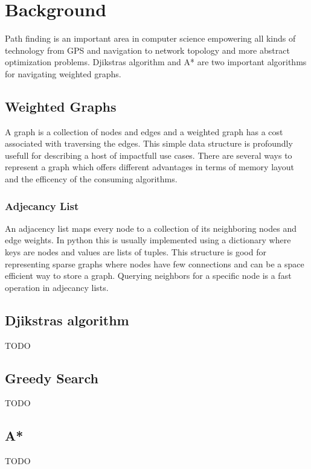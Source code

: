 \section{Background}
\label{sec:background}

Path finding is an important area in computer science empowering all kinds of technology from GPS and navigation to network topology and more abstract optimization problems.
Djikstras algorithm and A* are two important algorithms for navigating weighted graphs.

\subsection{Weighted Graphs}

A graph is a collection of nodes and edges and a weighted graph has a cost associated with traversing the edges. This simple data structure is profoundly usefull for describing a host of impactfull use cases. There are several ways to represent a graph which offers different advantages in terms of memory layout and the efficency of the consuming algorithms.

\subsubsection{Adjecancy List}
An adjacency list maps every node to a collection of its neighboring nodes and edge weights. In python this is usually implemented using a dictionary where keys are nodes and values are lists of tuples.
This structure is good for representing sparse graphs where nodes have few connections and can be a space efficient way to store a graph. Querying neighbors for a specific node is a fast operation in adjecancy lists.

\subsection{Djikstras algorithm}

TODO

\subsection{Greedy Search}

TODO

\subsection{A*}

TODO
